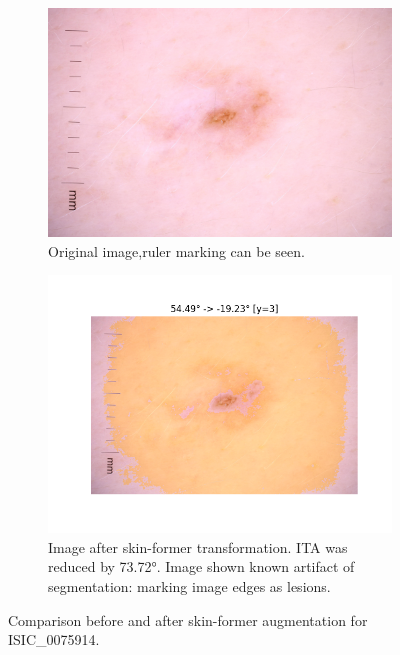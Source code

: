 \begin{figure}[ht]
    \centering
    \begin{subfigure}[b]{0.45\textwidth}
        \includegraphics[width=\linewidth]{figures/skin_former/ISIC_0075914.jpg}
        \caption{Original image,ruler marking can be seen.}
        \label{fig:original_0075914}
    \end{subfigure}
    \hfill
    \begin{subfigure}[b]{0.45\textwidth}
        \includegraphics[width=\linewidth]{figures/skin_former/ISIC_0075914.jpg_shifted.png}
        \caption{Image after skin-former transformation. ITA was reduced by 73.72°. Image shown known artifact of segmentation: marking image edges as lesions.}
        \label{fig:shifted_0075914}
    \end{subfigure}
    \caption{Comparison before and after skin-former augmentation for ISIC\_0075914.}
    \label{fig:skinformer_0075914}
\end{figure}

